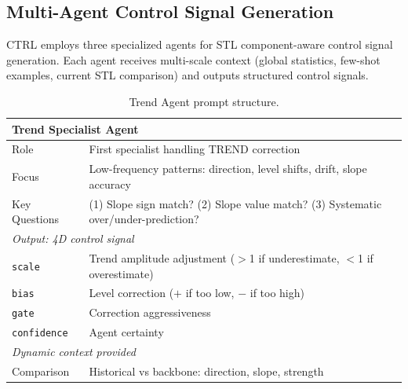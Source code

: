 \subsection{Multi-Agent Control Signal Generation}

CTRL employs three specialized agents for STL component-aware control signal generation. Each agent receives multi-scale context (global statistics, few-shot examples, current STL comparison) and outputs structured control signals.

\begin{table}[h!]
\centering
\scriptsize
\setlength{\tabcolsep}{3pt}
\begin{tabular}{p{1.8cm}p{5.2cm}}
\toprule
\multicolumn{2}{l}{\textbf{Trend Specialist Agent}} \\
\midrule
Role & First specialist handling TREND correction \\
Focus & Low-frequency patterns: direction, level shifts, drift, slope accuracy \\
Key Questions & (1) Slope sign match? (2) Slope value match? (3) Systematic over/under-prediction? \\
\midrule
\multicolumn{2}{l}{\textit{Output: 4D control signal}} \\
\texttt{scale} & Trend amplitude adjustment ($>$1 if underestimate, $<$1 if overestimate) \\
\texttt{bias} & Level correction ($+$ if too low, $-$ if too high) \\
\texttt{gate} & Correction aggressiveness \\
\texttt{confidence} & Agent certainty \\
\midrule
\multicolumn{2}{l}{\textit{Dynamic context provided}} \\
Comparison & Historical vs backbone: direction, slope, strength \\
\bottomrule
\end{tabular}
\caption{Trend Agent prompt structure.}
\label{tab:prompt_trend}
\end{table}

